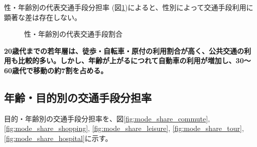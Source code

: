 \documentclass[a4paper,12pt, uplatex]{jsbook}
\begin{document}
\clearpage
性・年齢別の代表交通手段分担率 (図\ref{fig:mode_share_gender_age})によると、性別によって交通手段利用に顕著な差は存在しない。

\begin{figure}[htbp]
  \centering
	\caption{性・年齢別の代表交通手段割合}
	\label{fig:mode_share_gender_age}
\end{figure}

\color{red}
\begin{framed}
\noindent
\textbf{\large 20歳代までの若年層は、徒歩・自転車・原付の利用割合が高く、公共交通の利用も比較的多い。しかし、年齢が上がるにつれて自動車の利用が増加し、30〜60歳代で移動の約7割を占める。}
\end{framed}
\color{black}



\clearpage
\subsection{年齢・目的別の交通手段分担率}
目的・年齢別の交通手段分担率を、図\ref{fig:mode_share_commute}, \ref{fig:mode_share_shopping}, \ref{fig:mode_share_leisure}, \ref{fig:mode_share_tour}, \ref{fig:mode_share_hospital}に示す。
\end{document}
